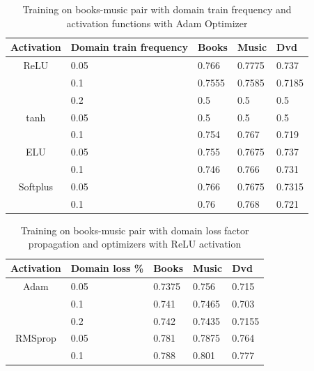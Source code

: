 \documentclass[11pt,a4paper]{article}
\begin{document}
\begin{table}[h]
\begin{center}
\begin{tabular}{|c|l|l|l|l|}
\hline
Activation & \multicolumn{1}{|p{1cm}|}{Domain train frequency}& Books & Music & Dvd \\
\hline
ReLU & 0.05 & 0.766 & 0.7775 & 0.737 \\
  & 0.1 & 0.7555 & 0.7585 & 0.7185 \\
  & 0.2 & 0.5 & 0.5 & 0.5 \\
\hline
tanh & 0.05 & 0.5 & 0.5 & 0.5  \\
  & 0.1 & 0.754 & 0.767 & 0.719 \\
\hline
ELU & 0.05 & 0.755 & 0.7675 & 0.737 \\
  & 0.1 & 0.746 & 0.766 & 0.731 \\
\hline
Softplus & 0.05 & 0.766 & 0.7675 & 0.7315 \\
  & 0.1 & 0.76 & 0.768 & 0.721 \\
\hline
\end{tabular}
\end{center}
\caption{ Training on books-music pair with domain train frequency and activation functions with Adam Optimizer}
\label{1d-activation-table}
\end{table}

\begin{table}[h]
\begin{center}
\begin{tabular}{|c|l|l|l|l|}
\hline
Activation & \multicolumn{1}{|p{1cm}|}{Domain loss \%}& Books & Music & Dvd \\
\hline
Adam & 0.05 & 0.7375 & 0.756 & 0.715 \\
 & 0.1 & 0.741 & 0.7465 & 0.703 \\
 & 0.2 & 0.742 & 0.7435 & 0.7155 \\
\hline
RMSprop & 0.05 & 0.781 & 0.7875 & 0.764 \\
 & 0.1 & 0.788 & 0.801 & 0.777 \\
\hline
\end{tabular}
\end{center}
\caption{ Training on books-music pair with domain loss factor propagation and optimizers with ReLU activation}
\label{alpha-optimizer-table}
\end{table}
\end{document}
